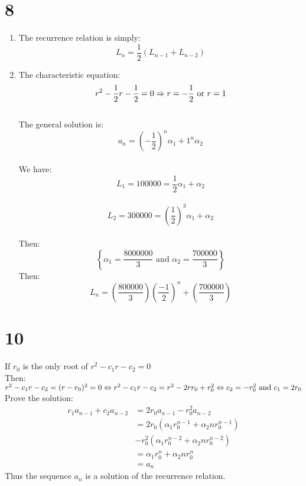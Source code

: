 \documentclass[12pt]{article}
\begin{document}
\begin{multicols}{2}
    \section*{8}
      \begin{enumerate}[label=\alph*)]
        \item The recurrence relation is simply:\\
        \[L_n=\frac{1}{2}(L_{n-1}+L_{n-2})\]
        \item The characteristic equation:\\
        \[r^2-\frac{1}{2}r-\frac{1}{2}=0\\
        \Rightarrow r=-\frac{1}{2} \text{ or } r=1\]\\
        The general solution is:\\
        \[a_n=\left(-\frac{1}{2}\right)^n\alpha_1+1^n\alpha_2\]\\
        We have:\\
         \[L_1=100000=\frac{1}{2}\alpha_1+\alpha_2\]\\
         \[L_2=300000=\left(\frac{1}{2}\right)^3\alpha_1+\alpha_2\]\\
         Then:
         \[\left\{\alpha_1=\frac{8000000}{3}\text{ and }
         \alpha_2=\frac{700000}{3}\right\}\]
         Then:
         \[L_n=\left(\frac{800000}{3}\right)\left(\frac{-1}{2}\right)^n+\left(\frac{700000}{3}\right)\]
      \end{enumerate}
    \section*{10}
      If \(r_0\) is the only root of \(r^2-c_1r-c_2=0\)\\
      Then: \(r^2-c_1r-c_2=(r-r_0)^2=0\\
      \Leftrightarrow r^2-c_1r-c_2=r^2-2rr_0+r_0^2\\
      \Leftrightarrow c_2=-r_0^2 \text{ and } c_1=2r_0\)\\
      Prove the solution:
      \begin{align*}
        c_1a_{n-1}+c_2a_{n-2}&=2r_0a_{n-1}-r_0^2a_{n-2}\\
        &=2r_0(\alpha_1r_0^{n-1}+\alpha_2nr_0^{n-1})\\
        &-r^2_0(\alpha_1r_0^{n-2}+\alpha_2nr_0^{n-2})\\
        &=\alpha_1r^n_0+\alpha_2nr^n_0\\
        &=a_n
      \end{align*}
      Thus the sequence {\(a_n\)} is a solution of the recurrence relation.


\end{multicols}
\end{document}
